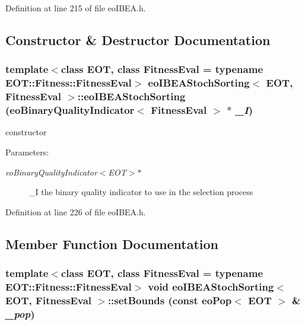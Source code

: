 Definition at line 215 of file eo\-IBEA.h.

\subsection{Constructor \& Destructor Documentation}
\subsubsection{\setlength{\rightskip}{0pt plus 5cm}template$<$class EOT, class Fitness\-Eval = typename EOT::Fitness::Fitness\-Eval$>$ {\bf eo\-IBEAStoch\-Sorting}$<$ EOT, Fitness\-Eval $>$::{\bf eo\-IBEAStoch\-Sorting} ({\bf eo\-Binary\-Quality\-Indicator}$<$ Fitness\-Eval $>$ $\ast$ {\em \_\-I})\hspace{0.3cm}{\tt  [inline]}}\label{classeoIBEAStochSorting_9d9775846e174bdbc9491856b23eb27d}


constructor 

\begin{Desc}
\item[Parameters:]
\begin{description}
\item[{\em eo\-Binary\-Quality\-Indicator$<$EOT$>$$\ast$}]\_\-I the binary quality indicator to use in the selection process \end{description}
\end{Desc}


Definition at line 226 of file eo\-IBEA.h.

\subsection{Member Function Documentation}
\subsubsection{\setlength{\rightskip}{0pt plus 5cm}template$<$class EOT, class Fitness\-Eval = typename EOT::Fitness::Fitness\-Eval$>$ void {\bf eo\-IBEAStoch\-Sorting}$<$ EOT, Fitness\-Eval $>$::set\-Bounds (const {\bf eo\-Pop}$<$ EOT $>$ \& {\em \_\-pop})\hspace{0.3cm}{\tt  [inline, private, virtual]}}\label{classeoIBEAStochSorting_2a5ddad942fee331fe6912a6fecc9247}


